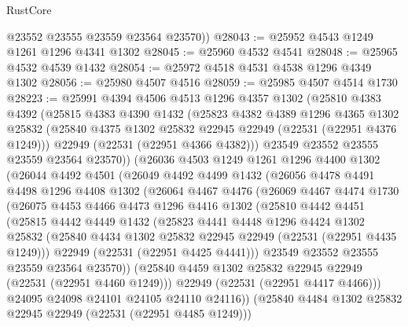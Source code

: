 \begin{lexlean}{RustCore}
\begin{coremodule}
        @23552
        @23555
        @23559
        @23564
        @23570))
@28043 := @25952 @4543 @1249 @1261 @1296 @4341 @1302
@28045 := @25960 @4532 @4541
@28048 := @25965 @4532 @4539 @1432
@28054 := @25972 @4518 @4531 @4538 @1296 @4349 @1302
@28056 := @25980 @4507 @4516
@28059 := @25985 @4507 @4514 @1730
@28223 := @25991
    @4394
    @4506
    @4513
    @1296
    @4357
    @1302
    (@25810
      @4383
      @4392
      (@25815
        @4383
        @4390
        @1432
        (@25823
          @4382
          @4389
          @1296
          @4365
          @1302
          @25832
          (@25840 @4375 @1302 @25832 @22945 @22949 (@22531 (@22951 @4376 @1249)))
          @22949
          (@22531 (@22951 @4366 @4382)))
        @23549
        @23552
        @23555
        @23559
        @23564
        @23570))
    (@26036
      @4503
      @1249
      @1261
      @1296
      @4400
      @1302
      (@26044
        @4492
        @4501
        (@26049
          @4492
          @4499
          @1432
          (@26056
            @4478
            @4491
            @4498
            @1296
            @4408
            @1302
            (@26064
              @4467
              @4476
              (@26069
                @4467
                @4474
                @1730
                (@26075
                  @4453
                  @4466
                  @4473
                  @1296
                  @4416
                  @1302
                  (@25810
                    @4442
                    @4451
                    (@25815
                      @4442
                      @4449
                      @1432
                      (@25823
                        @4441
                        @4448
                        @1296
                        @4424
                        @1302
                        @25832
                        (@25840 @4434 @1302 @25832 @22945 @22949 (@22531 (@22951 @4435 @1249)))
                        @22949
                        (@22531 (@22951 @4425 @4441)))
                      @23549
                      @23552
                      @23555
                      @23559
                      @23564
                      @23570))
                  (@25840 @4459 @1302 @25832 @22945 @22949 (@22531 (@22951 @4460 @1249)))
                  @22949
                  (@22531 (@22951 @4417 @4466)))
                @24095
                @24098
                @24101
                @24105
                @24110
                @24116))
            (@25840 @4484 @1302 @25832 @22945 @22949 (@22531 (@22951 @4485 @1249)))

\end{coremodule}
\end{lexlean}
